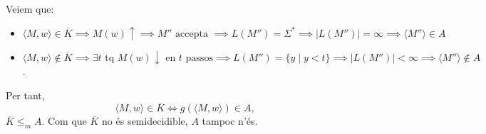 \documentclass{article}
\begin{document}
Veiem que:
\begin{itemize}
    \item $\langle M,w\rangle \in \overline{K} \implies M(w) \uparrow \implies  M'' \text{ accepta } \implies L(M'') = \Sigma^* \implies |L(M'')| = \infty \implies \langle M'' \rangle \in A$
    \item $\langle M,w\rangle \notin \overline{K} \implies \exists t \text{ tq } M(w) \downarrow \text{ en } t \text{ passos} \implies L(M'') = \{y \mid y < t\} \implies |L(M'')| < \infty \implies \langle M'' \rangle \notin A$.
\end{itemize}
Per tant,
$$
\langle M,w\rangle \in \overline{K} \iff g(\langle M,w\rangle) \in A,
$$
$\overline{K} \leq_m A$. Com que $\overline{K}$ no és semidecidible, $A$ tampoc n'és.
\end{document}
